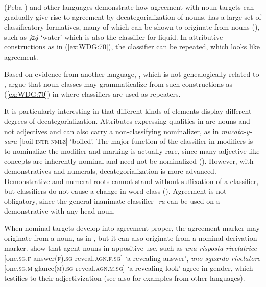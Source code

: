 \documentclass[output=collectionpaper]{langsci/langscibook}
\begin{document}
 (Peba-) and other  languages demonstrate how agreement with noun targets can gradually give rise to agreement by decategorialization of nouns.  has a large set of classificatory formatives, many of which can be shown to originate from nouns (\citealt[120]{Payne1986}), such as \textit{ja̧á̦} `water' which is also the classifier for liquid. In attributive constructions as in (\ref{ex:WDG:70}), the classifier can be repeated, which looks like agreement.

%

Based on evidence from another  language, , which is not genealogically related to , \cite[278--279]{Grinevald2004} argue that noun classes may grammaticalize from such constructions as (\ref{ex:WDG:70}) in  where classifiers are used as repeaters.

It is particularly interesting in  that different kinds of elements display different degrees of decategorialization. Attributes expressing qualities in  are nouns and not adjectives and can also carry a non-classifying nominalizer, as in \textit{mucata-y-sara} [boil-\textsc{intr-nmlz}] `boiled'. The major function of the classifier in modifiers is to nominalize the modifier and marking is actually rare, since many adjective-like concepts are inherently nominal and need not be nominalized (\citealt[127]{Payne1986}). However, with demonstratives and numerals, decategorialization is more advanced. Demonstrative and numeral roots cannot stand without suffixation of a classifier, but classifiers do not cause a change in word class (\citealt[127]{Payne1986}). Agreement is not obligatory, since the general inanimate classifier \textit{-ra} can be used on a demonstrative with any head noun.

When nominal targets develop into agreement proper, the agreement marker may originate from a noun, as in , but it can also originate from a nominal derivation marker. \cite{Dressler1990} show that  agent nouns in appositive use, such as \textit{una risposta rivelatrice} [one.\textsc{sg.f} answer\textsc{(f).sg} reveal.\textsc{agn.f.sg}] `a revealing answer', \textit{uno sguardo rivelatore} [one.\textsc{sg.m} glance\textsc{(m).sg} reveal.\textsc{agn.m.sg}] `a revealing look' agree in gender, which testifies to their adjectivization (see also \citealt[75--76]{Luraghi2015} for examples from other  languages).
\end{document}
